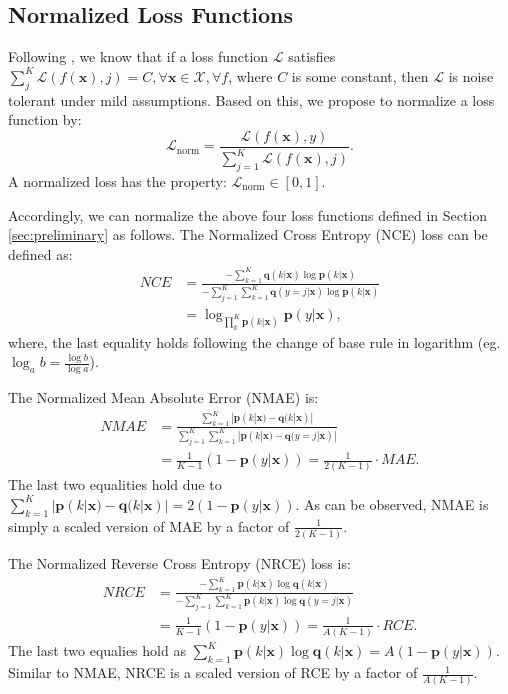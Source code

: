 \documentclass{article}
\def \xx {{\bm{x}}}
\def \pp {{\bm{p}}}
\def \qq {{\bm{q}}}
\def \X  {\mathcal{X}}
\def \L  {\mathcal{L}}
\begin{document}
\subsection{Normalized Loss Functions}\label{normalized_loss}
Following \cite{ghosh2017robust,charoenphakdee2019symmetric}, we know that if a loss function $\L$ satisfies $\sum_{j}^{K} \L(f(\xx), j) = C, \forall \xx \in \X, \forall f$,
where $C$ is some constant, then $\L$ is noise tolerant under mild assumptions.
Based on this, we propose to normalize a loss function by:
\begin{equation}\label{eq:normalized_loss}
    \L_{\text{norm}} = \frac{\L(f(\xx), y)}{\sum_{j=1}^{K}\L(f(\xx), j)}.
\end{equation}
A normalized loss has the property: $\L_{\text{norm}} \in [0, 1]$.

Accordingly, we can normalize the above four loss functions defined in Section \ref{sec:preliminary} as follows.
The Normalized Cross Entropy (NCE) loss can be defined as:
\begin{equation}\label{eq:nce}
\begin{split}
    NCE &= \frac{-\sum_{k=1}^{K} \qq(k|\xx) \log \pp(k|\xx)}{-\sum_{j=1}^{K}\sum_{k=1}^{K} \qq(y=j|\xx) \log \pp(k|\xx)} \\
    &= \log_{\prod_{k}^{K} \pp(k|\xx)}\pp(y|\xx),
\end{split}
\end{equation}
where, the last equality holds following the change of base rule in logarithm (eg. $\log_a b = \frac{\log b}{\log a}$). 

The Normalized Mean Absolute Error (NMAE) is:
\begin{equation}\label{eq:nmae}
\begin{split}
    NMAE &= \frac{\sum_{k=1}^{K} |\pp(k|\xx) - \qq(k|\xx)|}{\sum_{j=1}^{K}\sum_{k=1}^{K} |\pp(k|\xx) - \qq(y=j|\xx)|} \\
    &= \frac{1}{K-1}(1 - \pp(y|\xx)) = \frac{1}{2(K-1)} \cdot MAE.
\end{split}
\end{equation}
The last two equalities hold due to $\sum_{k=1}^{K} |\pp(k|\xx) - \qq(k|\xx)| = 2(1 - \pp(y|\xx))$.
As can be observed, NMAE is simply a scaled version of MAE by a factor of $\frac{1}{2(K-1)}$.

The Normalized Reverse Cross Entropy (NRCE) loss is:
\begin{equation}\label{eq:nrce}
\begin{split}
    NRCE &= \frac{-\sum_{k=1}^{K} \pp(k|\xx) \log \qq(k|\xx)}{-\sum_{j=1}^{K}\sum_{k=1}^{K} \pp(k|\xx) \log \qq(y=j|\xx)} \\
    &= \frac{1}{K-1}(1 - \pp(y|\xx)) = \frac{1}{A(K-1)} \cdot RCE.
\end{split}
\end{equation}
The last two equalies hold as $\sum_{k=1}^{K} \pp(k|\xx) \log \qq(k|\xx) = A(1-\pp(y|\xx))$.
Similar to NMAE, NRCE is a scaled version of RCE by a factor of $\frac{1}{A(K-1)}$.
\end{document}
